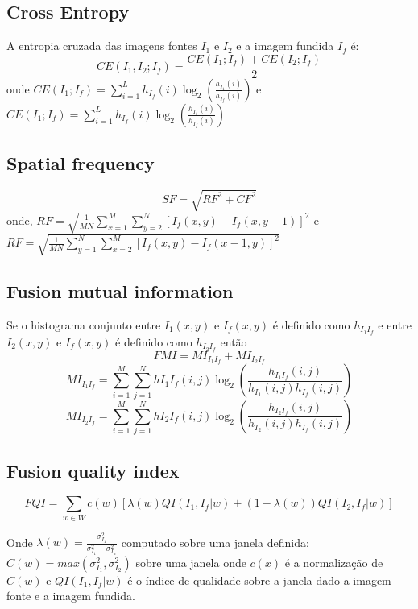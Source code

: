 \documentclass[conference]{IEEEtran}
\begin{document}
\subsection{Cross Entropy}
A entropia cruzada das imagens fontes $I_1$ e $I_2$ e a imagem fundida $I_f$ é:
\begin{equation}
CE(I_1,I_2;I_f)=\frac{CE(I_1;I_f)+CE(I_2;I_f)}{2}
\end{equation}
onde $CE(I_1;I_f)=\sum_{i=1}^Lh_{I_f}(i)\log_2\left( \frac{h_{I_1}(i)}{h_{I_f}(i)}\right)$ e $CE(I_1;I_f)=\sum_{i=1}^Lh_{I_f}(i)\log_2\left( \frac{h_{I_1}(i)}{h_{I_f}(i)}\right)$
\subsection{Spatial frequency}
\begin{equation}
SF=\sqrt{RF^2+CF^2}
\end{equation}
onde, $RF=\sqrt{\frac{1}{MN}\sum_{x=1}^M\sum_{y=2}^N[I_f(x,y)-I_f(x,y-1)]^2}$ e $RF=\sqrt{\frac{1}{MN}\sum_{y=1}^N\sum_{x=2}^M[I_f(x,y)-I_f(x-1,y)]^2}$
\subsection{Fusion mutual information}
Se o histograma conjunto entre $I_1(x,y)$ e $I_f(x,y)$ é definido como $h_{I_1I_f}$ e entre $I_2(x,y)$ e $I_f(x,y)$ é definido como $h_{I_2I_f}$ então
\begin{equation}
FMI = MI_{I_1I_f}+MI_{I_2I_f}
\end{equation}
$$MI_{I_1I_f}= \sum_{i=1}^M\sum_{j=1}^N h{I_1I_f}(i,j)\log_2\left(\frac{h_{I_1I_f}(i,j)}{h_{I_1}(i,j)h_{I_f}(i,j)} \right)$$
$$MI_{I_2I_f}= \sum_{i=1}^M\sum_{j=1}^N h{I_2I_f}(i,j)\log_2\left(\frac{h_{I_2I_f}(i,j)}{h_{I_2}(i,j)h_{I_f}(i,j)} \right)$$
\subsection{Fusion quality index}
\begin{equation}
FQI = \sum_{w\in W}c(w)[\lambda(w)QI(I_1,I_f|w)+(1-\lambda(w))QI(I_2,I_f|w)] 
\end{equation}

Onde $\lambda(w)=\frac{\sigma_{I_1}^2}{\sigma_{I_1}^2+\sigma_{I_w}^2}$ computado sobre uma janela definida; $C(w)=max(\sigma_{I_1}^2,\sigma_{I_2}^2)$ sobre uma janela onde $c(x)$ é a normalização de $C(w)$ e $QI(I_1,I_f|w)$ é o índice de qualidade sobre a janela dado a imagem fonte e a imagem fundida.
\end{document}
